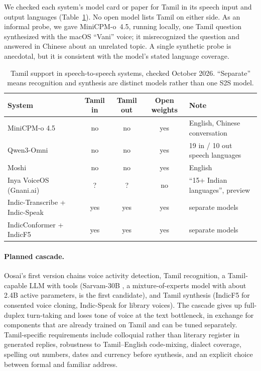 \documentclass[11pt]{article}
\begin{document}
We checked each system's model card or paper for Tamil in its speech input and output languages
(Table~\ref{tab:gap}). No open model lists Tamil on either side. As an informal probe, we gave
MiniCPM-o~4.5, running locally, one Tamil question synthesized with the macOS ``Vani'' voice; it
misrecognized the question and answered in Chinese about an unrelated topic. A single synthetic
probe is anecdotal, but it is consistent with the model's stated language coverage.

\begin{table}[t]
\centering\small
\caption{Tamil support in speech-to-speech systems, checked October 2026. ``Separate'' means
recognition and synthesis are distinct models rather than one S2S model.}
\label{tab:gap}
\setlength{\tabcolsep}{4pt}
\begin{tabular}{lcccl}
\toprule
System & Tamil in & Tamil out & Open weights & Note \\
\midrule
MiniCPM-o 4.5 \citep{cui2026minicpmo} & no & no & yes & English, Chinese conversation \\
Qwen3-Omni \citep{xu2025qwen3omni} & no & no & yes & 19 in / 10 out speech languages \\
Moshi \citep{defossez2024moshi} & no & no & yes & English \\
Inya VoiceOS (Gnani.ai) \citep{gnani2026inya} & ? & ? & no & ``15+ Indian languages'', preview \\
Indic-Transcribe + Indic-Speak & yes & yes & yes & separate models \\
IndicConformer + IndicF5 & yes & yes & yes & separate models \\
\bottomrule
\end{tabular}
\end{table}

\paragraph{Planned cascade.}
Oosai's first version chains voice activity detection, Tamil recognition, a Tamil-capable LLM with
tools (Sarvam-30B \citep{sarvam2026sarvam30b}, a mixture-of-experts model with about 2.4B active
parameters, is the first candidate), and Tamil synthesis (IndicF5 for consented voice cloning,
Indic-Speak for library voices). The cascade gives up full-duplex turn-taking and loses tone of
voice at the text bottleneck, in exchange for components that are already trained on Tamil and can
be tuned separately. Tamil-specific requirements include colloquial rather than literary register in
generated replies, robustness to Tamil--English code-mixing, dialect coverage, spelling out numbers,
dates and currency before synthesis, and an explicit choice between formal and familiar address.
\end{document}
